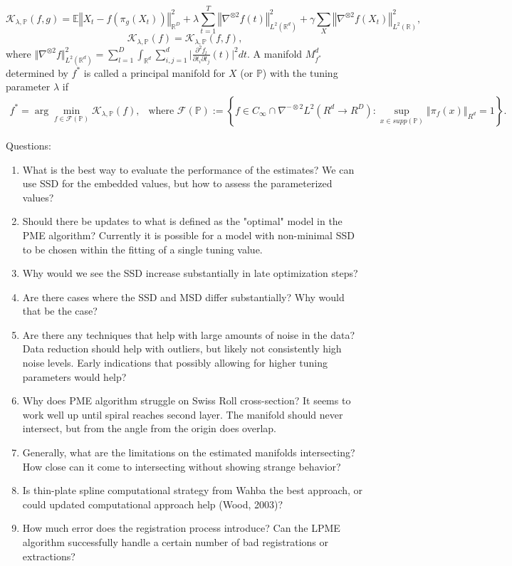 \documentclass[11pt,reqno]{article}
\begin{document}
	\begin{equation}\label{PMSEF}
	\mathcal{K}_{\lambda,\mathbb{P}}(f,g)=\mathbb{E}\left\Vert X_t - f\left(\pi_g(X_t)\right)\right\Vert^2_{\mathbb{R}^D} + \lambda \sum_{t = 1}^T \left\Vert\nabla^{\otimes 2} f(t)\right\Vert_{L^2(\mathbb{R}^d)}^2 + \gamma \sum_{X} \left\Vert\nabla^{\otimes 2} f(X_t)\right\Vert_{L^2(\mathbb{R})}^2, 
	\end{equation}
	\begin{equation}\nonumber
	\mathcal{K}_{\lambda,\mathbb{P}}(f)=\mathcal{K}_{\lambda,\mathbb{P}}(f,f),
	\end{equation}
	where $\Vert\nabla^{\otimes 2}f \Vert_{L^2(\mathbb{R}^d)}^2 = \sum_{l=1}^D\int_{\mathbb{R}^d} \sum_{i,j=1}^d\vert\frac{\partial^2 f_l}{\partial t_i \partial t_j}(t)\vert^2dt$. A manifold $M_{f^*}^d$ determined by $f^*$ is called a principal manifold for $X$ (or $\mathbb{P}$) with the tuning parameter $\lambda$ if 
	\begin{align}\label{def: PM}
	f^*=\arg\min_{f\in\mathscr{F}(\mathbb{P})}\mathcal{K}_{\lambda,\mathbb{P}}(f),\ \ \mbox{ where }\mathscr{F}(\mathbb{P}):=\left\{f\in C_\infty\cap \nabla^{-\otimes 2}L^2( R^d \rightarrow R^D):\sup_{x\in supp(\mathbb{P})}\left\Vert\pi_f(x)\right\Vert_{R^d} = 1 \right\}.
	\end{align}

Questions:
\begin{enumerate}
  \item What is the best way to evaluate the performance of the estimates? We can use SSD for the embedded values, but how to assess the parameterized values?
  \item Should there be updates to what is defined as the "optimal" model in the PME algorithm? Currently it is possible for a model with non-minimal SSD to be chosen within the fitting of a single tuning value.
  \item Why would we see the SSD increase substantially in late optimization steps?
  \item Are there cases where the SSD and MSD differ substantially? Why would that be the case?
  \item Are there any techniques that help with large amounts of noise in the data? Data reduction should help with outliers, but likely not consistently high noise levels. Early indications that possibly allowing for higher tuning parameters would help?
  \item Why does PME algorithm struggle on Swiss Roll cross-section? It seems to work well up until spiral reaches second layer. The manifold should never intersect, but from the angle from the origin does overlap.
  \item Generally, what are the limitations on the estimated manifolds intersecting? How close can it come to intersecting without showing strange behavior?
  \item Is thin-plate spline computational strategy from Wahba the best approach, or could updated computational approach help (Wood, 2003)?
  \item How much error does the registration process introduce? Can the LPME algorithm successfully handle a certain number of bad registrations or extractions?
\end{enumerate}

\nocite{*}


\end{document}
